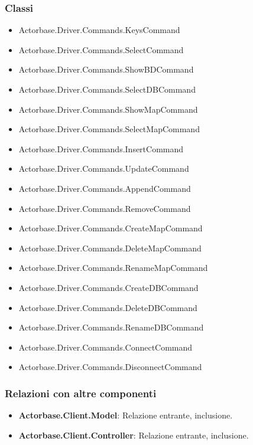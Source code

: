 \documentclass[a4paper]{article}
\begin{document}
		\subsubsection{Classi}
			\begin{itemize}
				\item Actorbase.Driver.Commands.KeysCommand
				\item Actorbase.Driver.Commands.SelectCommand
				\item Actorbase.Driver.Commands.ShowBDCommand
				\item Actorbase.Driver.Commands.SelectDBCommand
				\item Actorbase.Driver.Commands.ShowMapCommand
				\item Actorbase.Driver.Commands.SelectMapCommand
				\item Actorbase.Driver.Commands.InsertCommand
				\item Actorbase.Driver.Commands.UpdateCommand
				\item Actorbase.Driver.Commands.AppendCommand
				\item Actorbase.Driver.Commands.RemoveCommand
				\item Actorbase.Driver.Commands.CreateMapCommand
				\item Actorbase.Driver.Commands.DeleteMapCommand
				\item Actorbase.Driver.Commands.RenameMapCommand
				\item Actorbase.Driver.Commands.CreateDBCommand
				\item Actorbase.Driver.Commands.DeleteDBCommand
				\item Actorbase.Driver.Commands.RenameDBCommand
				\item Actorbase.Driver.Commands.ConnectCommand
				\item Actorbase.Driver.Commands.DisconnectCommand
			\end{itemize}
		
		\subsubsection{Relazioni con altre componenti}
			\begin{itemize}
				\item \textbf{Actorbase.Client.Model}: Relazione entrante, inclusione.
				\item \textbf{Actorbase.Client.Controller}:	Relazione entrante, inclusione.
			\end{itemize}

		
\end{document}
